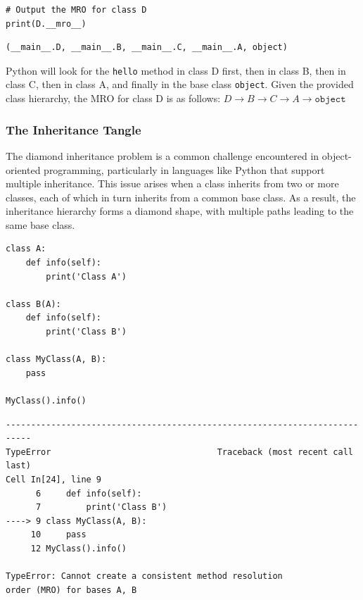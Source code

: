 \begin{codebox}
\begin{verbatim}
# Output the MRO for class D
print(D.__mro__)
\end{verbatim}
\end{codebox}
\begin{verbatim}
(__main__.D, __main__.B, __main__.C, __main__.A, object)
\end{verbatim}

Python will look for the \texttt{hello} method in class D first, then in class B, then in class C, then in class A, and finally in the base class \texttt{object}. Given the provided class hierarchy, the MRO for class D is as follows: 
$D \to B \to C \to A \to \texttt{object}$\\

\newpage
\subsubsection{The Inheritance Tangle}
The diamond inheritance problem is a common challenge encountered in object-oriented programming, particularly in languages like Python that support multiple inheritance. This issue arises when a class inherits from two or more classes, each of which in turn inherits from a common base class. As a result, the inheritance hierarchy forms a diamond shape, with multiple paths leading to the same base class.

\begin{codebox}
\begin{verbatim}
class A:
    def info(self):
        print('Class A')

class B(A):
    def info(self):
        print('Class B')

class MyClass(A, B):
    pass

MyClass().info()
\end{verbatim}
\end{codebox}

\begin{verbatim}
---------------------------------------------------------------------------
TypeError                                 Traceback (most recent call last)
Cell In[24], line 9
      6     def info(self):
      7         print('Class B')
----> 9 class MyClass(A, B):
     10     pass
     12 MyClass().info()

TypeError: Cannot create a consistent method resolution
order (MRO) for bases A, B
\end{verbatim}

